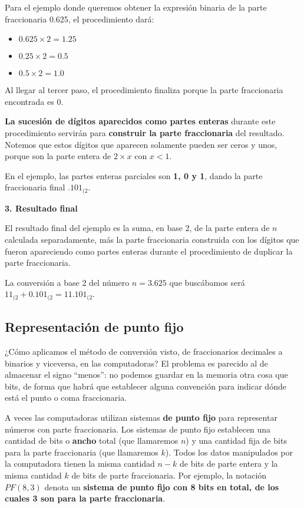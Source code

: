 \documentclass[spanish,A4,]{article}
\begin{document}
Para el ejemplo donde queremos obtener la expresión binaria de la parte
fraccionaria 0.625, el procedimiento dará:

\begin{itemize}
\itemsep1pt\parskip0pt
\item
  $0.625 \times 2 = 1.25$
\item
  $0.25 \times 2 = 0.5$
\item
  $0.5 \times 2 = 1.0$
\end{itemize}

Al llegar al tercer paso, el procedimiento finaliza porque la parte
fraccionaria encontrada es 0.

\textbf{La sucesión de dígitos aparecidos como partes enteras} durante
este procedimiento servirán para \textbf{construir la parte
fraccionaria} del resultado. Notemos que estos dígitos que aparecen
solamente pueden ser ceros y unos, porque son la parte entera de
$2\times x$ con $x < 1$.

En el ejemplo, las partes enteras parciales son \textbf{1, 0 y 1}, dando
la parte fraccionaria final $.101_{(2}$.

\textbf{3. Resultado final}

El resultado final del ejemplo es la suma, en base 2, de la parte entera
de $n$ calculada separadamente, más la parte fraccionaria construida con
los dígitos que fueron apareciendo como partes enteras durante el
procedimiento de duplicar la parte fraccionaria.

La conversión a base 2 del número $n = 3.625$ que buscábamos será
$11_{(2} + 0.101_{(2} = 11.101_{(2}$.

\subsection{Representación de punto
fijo}\label{representaciuxf3n-de-punto-fijo}

¿Cómo aplicamos el método de conversión visto, de fraccionarios
decimales a binarios y viceversa, en las computadoras? El problema es
parecido al de almacenar el signo ``menos'': no podemos guardar en la
memoria otra cosa que bits, de forma que habrá que establecer alguna
convención para indicar dónde está el punto o coma fraccionaria.

A veces las computadoras utilizan sistemas \textbf{de punto fijo} para
representar números con parte fraccionaria. Los sistemas de punto fijo
establecen una cantidad de bits o \textbf{ancho} total (que llamaremos
$n$) y una cantidad fija de bits para la parte fraccionaria (que
llamaremos $k$). Todos los datos manipulados por la computadora tienen
la misma cantidad $n-k$ de bits de parte entera y la misma cantidad $k$
de bits de parte fraccionaria. Por ejemplo, la notación $PF(8,3)$ denota
un \textbf{sistema de punto fijo con 8 bits en total, de los cuales 3
son para la parte fraccionaria}.
\end{document}

